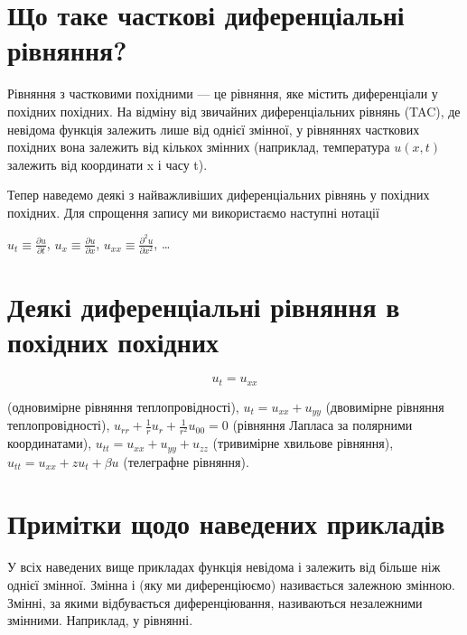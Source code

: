\documentclass[
  ukrainian,
]{article}
\begin{document}
\section{Що таке часткові диференціальні
рівняння?}\label{ux449ux43e-ux442ux430ux43aux435-ux447ux430ux441ux442ux43aux43eux432ux456-ux434ux438ux444ux435ux440ux435ux43dux446ux456ux430ux43bux44cux43dux456-ux440ux456ux432ux43dux44fux43dux43dux44f}

Рівняння з частковими похідними --- це рівняння, яке містить
диференціали у похідних похідних. На відміну від звичайних
диференціальних рівнянь (TAC), де невідома функція залежить лише від
однієї змінної, у рівняннях часткових похідних вона залежить від кількох
змінних (наприклад, температура \(u(x, t)\) залежить від координати x і
часу t).

Тепер наведемо деякі з найважливіших диференціальних рівнянь у похідних
похідних. Для спрощення запису ми використаємо наступні нотації

\(u_t \equiv \frac{\partial u}{\partial t}\),
\(u_x \equiv \frac{\partial u}{\partial x}\),
\(u_{xx} \equiv \frac{\partial^2 u}{\partial x^2}\), \ldots{}

\section{Деякі диференціальні рівняння в похідних
похідних}\label{ux434ux435ux44fux43aux456-ux434ux438ux444ux435ux440ux435ux43dux446ux456ux430ux43bux44cux43dux456-ux440ux456ux432ux43dux44fux43dux43dux44f-ux432-ux43fux43eux445ux456ux434ux43dux438ux445-ux43fux43eux445ux456ux434ux43dux438ux445}

\[
u_t = u_{xx}
\]

(одновимірне рівняння теплопровідності), \(u_t = u_{xx} + u_{yy}\)
(двовимірне рівняння теплопровідності),
\(u_{rr} + \frac{1}{r}u_r + \frac{1}{r^2}u_{00} = 0\) (рівняння Лапласа
за полярними координатами), \(u_{tt} = u_{xx} + u_{yy} + u_{zz}\)
(тривимірне хвильове рівняння), \(u_{tt} = u_{xx} + zu_t + \beta u\)
(телеграфне рівняння).

\section{Примітки щодо наведених
прикладів}\label{ux43fux440ux438ux43cux456ux442ux43aux438-ux449ux43eux434ux43e-ux43dux430ux432ux435ux434ux435ux43dux438ux445-ux43fux440ux438ux43aux43bux430ux434ux456ux432}

У всіх наведених вище прикладах функція невідома і залежить від більше
ніж однієї змінної. Змінна і (яку ми диференціюємо) називається залежною
змінною. Змінні, за якими відбувається диференціювання, називаються
незалежними змінними. Наприклад, у рівнянні.
\end{document}
